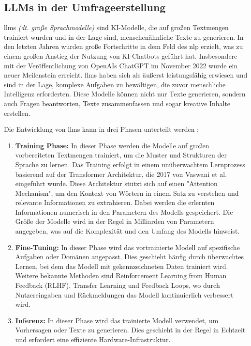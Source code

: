 \subsection{LLMs in der Umfrageerstellung} \label{sec:llm}

\acfp{llm} \textit{(dt. große Sprachmodelle)} sind KI-Modelle, die auf großen Textmengen trainiert wurden und in der Lage sind, menschenähnliche Texte zu generieren. In den letzten Jahren wurden große Fortschritte in dem Feld des \ac{nlp} erzielt, was zu einem großen Anstieg der Nutzung von KI-Chatbots geführt hat. Insbesondere mit der Veröffentlichung von OpenAIs ChatGPT im November 2022 wurde ein neuer Meilenstein erreicht. \acp{llm} haben sich als äußerst leistungsfähig erwiesen und sind in der Lage, komplexe Aufgaben zu bewältigen, die zuvor menschliche Intelligenz erforderten. Diese Modelle können nicht nur Texte generieren, sondern auch Fragen beantworten, Texte zusammenfassen und sogar kreative Inhalte erstellen. \cite{llm-grundlagen}

Die Entwicklung von \acp{llm} kann in drei Phasen unterteilt werden \cite{llm-grundlagen}:
\begin{enumerate}
    \item \textbf{Training Phase:} In dieser Phase werden die Modelle auf großen vorbereiteten Textmengen trainiert, um die Muster und Strukturen der Sprache zu lernen. Das Training erfolgt in einem unüberwachtem Lernprozess basierend auf der Transformer Architektur, die 2017 von Vaswani et al. eingeführt wurde. Diese Architektur stützt sich auf einen "Attention Mechanism", um den Kontext von Wörtern in einem Satz zu verstehen und relevante Informationen zu extrahieren. \cite{llm-attention} Dabei werden die erlernten Informationen numerisch in den Parametern des Modells gespeichert. Die Größe der Modelle wird in der Regel in Milliarden von Parametern angegeben, was auf die Komplexität und den Umfang des Modells hinweist. \cite{llm-grundlagen}
    \item \textbf{Fine-Tuning:} In dieser Phase wird das vortrainierte Modell auf spezifische Aufgaben oder Domänen angepasst. Dies geschieht häufig durch überwachtes Lernen, bei dem das Modell mit gekennzeichneten Daten trainiert wird. Weitere bekannte Methoden sind Reinforcement Learning from Human Feedback (RLHF), Transfer Learning und Feedback Loops, wo durch Nutzereingaben und Rückmeldungen das Modell kontinuierlich verbessert wird. \cite{llm-privacy} 
    \item \textbf{Inferenz:} In dieser Phase wird das trainierte Modell verwendet, um Vorhersagen oder Texte zu generieren. Dies geschieht in der Regel in Echtzeit und erfordert eine effiziente Hardware-Infrastruktur.
\end{enumerate} 

